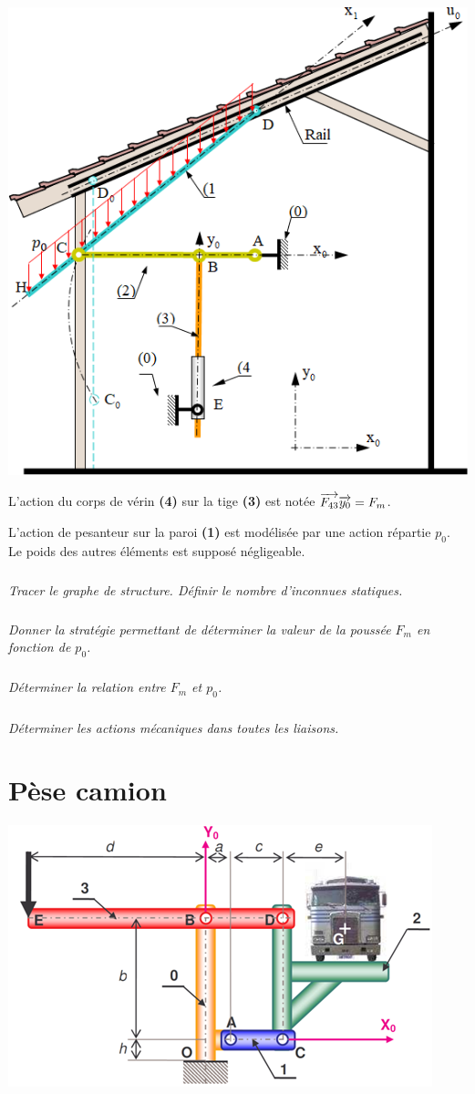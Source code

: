 \documentclass[10pt,fleqn]{article} %
\begin{document}
\begin{multicols}{2}
\begin{center}
\includegraphics[width=.9\linewidth]{images/fig_04}
\end{center}

L'action du corps de vérin \textbf{(4)} sur la tige \textbf{(3)} est notée $\overrightarrow{F_{43}}\overrightarrow{y_0}=F_m$.

L'action de pesanteur sur la paroi \textbf{(1)} est modélisée par une action répartie $p_0$. Le poids des autres éléments est supposé négligeable.

\subparagraph{}\textit{Tracer le graphe de structure. Définir le nombre d'inconnues statiques.}

\subparagraph{}\textit{Donner la stratégie permettant de déterminer la valeur de la poussée $F_m$ en fonction de $p_0$.}

\subparagraph{}\textit{Déterminer la relation entre $F_m$ et $p_0$.}

\subparagraph{}\textit{Déterminer les actions mécaniques dans toutes les liaisons.}


\section*{Pèse camion}

\begin{center}
\includegraphics[width=.9\linewidth]{images/fig_05}
\end{center}


\end{multicols}
\end{document}
